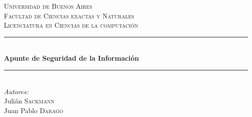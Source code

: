 \documentclass[]{article}
\begin{document}
\begin{titlepage}

\newcommand{\HRule}{\rule{\linewidth}{0.5mm}} %

\center %


\textsc{\LARGE Universidad de Buenos Aires}\\[1.5cm] %
\textsc{\Large Facultad de Ciencias exactas y Naturales}\\[0.5cm] %
\textsc{\large Licenciatura en Ciencias de la computación}\\[0.5cm] %


\HRule \\[0.4cm]
{ \huge \bfseries Apunte de Seguridad de la Información}\\[0.4cm] %
\HRule \\[1.5cm]

%

\Large \emph{Autores:}\\
Julián \textsc{Sackmann}\\%
Juan Pablo \textsc{Darago}\\[1cm] %


\end{titlepage}
\end{document}
